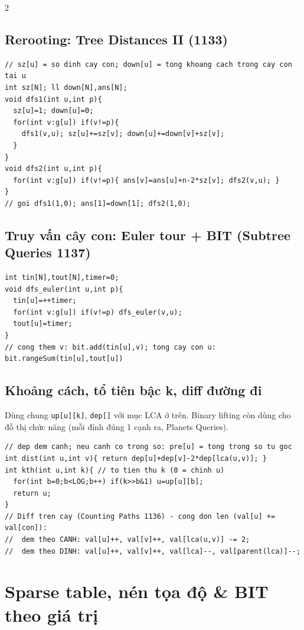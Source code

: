 \documentclass[8pt]{extarticle}
\begin{document}
\begin{multicols}{2}
\subsection{Rerooting: Tree Distances II (1133)}
\begin{lstlisting}
// sz[u] = so dinh cay con; down[u] = tong khoang cach trong cay con tai u
int sz[N]; ll down[N],ans[N];
void dfs1(int u,int p){
  sz[u]=1; down[u]=0;
  for(int v:g[u]) if(v!=p){
    dfs1(v,u); sz[u]+=sz[v]; down[u]+=down[v]+sz[v];
  }
}
void dfs2(int u,int p){
  for(int v:g[u]) if(v!=p){ ans[v]=ans[u]+n-2*sz[v]; dfs2(v,u); }
}
// goi dfs1(1,0); ans[1]=down[1]; dfs2(1,0);
\end{lstlisting}

\subsection{Truy vấn cây con: Euler tour + BIT (Subtree Queries 1137)}
\begin{lstlisting}
int tin[N],tout[N],timer=0;
void dfs_euler(int u,int p){
  tin[u]=++timer;
  for(int v:g[u]) if(v!=p) dfs_euler(v,u);
  tout[u]=timer;
}
// cong them v: bit.add(tin[u],v); tong cay con u: bit.rangeSum(tin[u],tout[u])
\end{lstlisting}

\subsection{Khoảng cách, tổ tiên bậc k, diff đường đi}
Dùng chung \texttt{up[u][k]}, \texttt{dep[]} với mục LCA ở trên. Binary lifting còn dùng cho đồ thị chức năng (mỗi đỉnh đúng 1 cạnh ra, Planets Queries).
\begin{lstlisting}
// dep dem canh; neu canh co trong so: pre[u] = tong trong so tu goc
int dist(int u,int v){ return dep[u]+dep[v]-2*dep[lca(u,v)]; }
int kth(int u,int k){ // to tien thu k (0 = chinh u)
  for(int b=0;b<LOG;b++) if(k>>b&1) u=up[u][b];
  return u;
}
// Diff tren cay (Counting Paths 1136) - cong don len (val[u] += val[con]):
//  dem theo CANH: val[u]++, val[v]++, val[lca(u,v)] -= 2;
//  dem theo DINH: val[u]++, val[v]++, val[lca]--, val[parent(lca)]--;
\end{lstlisting}

\section{Sparse table, nén tọa độ \& BIT theo giá trị}

\end{multicols}
\end{document}
